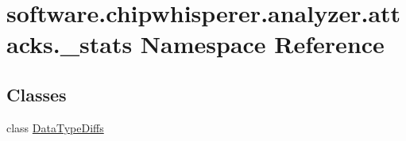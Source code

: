 \hypertarget{namespacesoftware_1_1chipwhisperer_1_1analyzer_1_1attacks_1_1__stats}{}\section{software.\+chipwhisperer.\+analyzer.\+attacks.\+\_\+stats Namespace Reference}
\label{namespacesoftware_1_1chipwhisperer_1_1analyzer_1_1attacks_1_1__stats}
\subsection*{Classes}
\begin{DoxyCompactItemize}
\item 
class \hyperlink{classsoftware_1_1chipwhisperer_1_1analyzer_1_1attacks_1_1__stats_1_1DataTypeDiffs}{Data\+Type\+Diffs}
\end{DoxyCompactItemize}
